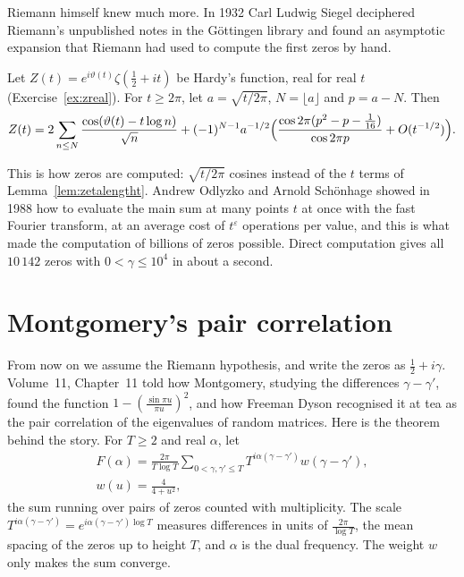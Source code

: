 Riemann himself knew much more. In 1932 Carl Ludwig Siegel deciphered Riemann's unpublished notes in the Göttingen library and found an asymptotic expansion that Riemann had used to compute the first zeros by hand.

\begin{theorem}\label{thm:riemannsiegel}
Let $Z(t)=e^{i\vartheta(t)}\zeta(\frac12+it)$ be Hardy's function, real for real $t$ (Exercise~\ref{ex:zreal}). For $t\ge2\pi$, let $a=\sqrt{t/2\pi}$, $N=\lfloor a\rfloor$ and $p=a-N$. Then
\[
Z(t)=2\sum_{n\le N}\frac{\cos(\vartheta(t)-t\log n)}{\sqrt n}+(-1)^{N-1}a^{-1/2}\Bigl(\frac{\cos2\pi(p^2-p-\frac1{16})}{\cos2\pi p}+O(t^{-1/2})\Bigr).
\]
\end{theorem}

This is how zeros are computed: $\sqrt{t/2\pi}$ cosines instead of the $t$ terms of Lemma~\ref{lem:zetalengtht}. Andrew Odlyzko and Arnold Schönhage showed in 1988 how to evaluate the main sum at many points $t$ at once with the fast Fourier transform, at an average cost of $t^{\varepsilon}$ operations per value, and this is what made the computation of billions of zeros possible. Direct computation gives all $10\,142$ zeros with $0<\gamma\le10^4$ in about a second.

\section{Montgomery's pair correlation}

From now on we assume the Riemann hypothesis, and write the zeros as $\frac12+i\gamma$. Volume~11, Chapter~11 told how Montgomery, studying the differences $\gamma-\gamma'$, found the function $1-(\frac{\sin\pi u}{\pi u})^2$, and how Freeman Dyson recognised it at tea as the pair correlation of the eigenvalues of random matrices. Here is the theorem behind the story. For $T\ge2$ and real $\alpha$, let
\[
\begin{gathered}F(\alpha)=\frac{2\pi}{T\log T}\sum_{0<\gamma,\gamma'\le T}T^{i\alpha(\gamma-\gamma')}w(\gamma-\gamma'),\\w(u)=\frac4{4+u^2},\end{gathered}
\]
the sum running over pairs of zeros counted with multiplicity. The scale $T^{i\alpha(\gamma-\gamma')}=e^{i\alpha(\gamma-\gamma')\log T}$ measures differences in units of $\frac{2\pi}{\log T}$, the mean spacing of the zeros up to height $T$, and $\alpha$ is the dual frequency. The weight $w$ only makes the sum converge.

